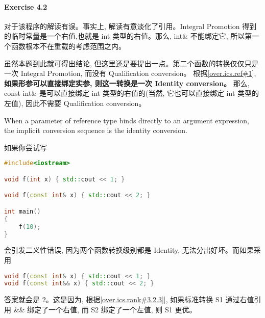 \documentclass{article}
\begin{document}
	\paragraph*{Exercise 4.2} 
	
	对于该程序的解读有误。事实上, 解读有意淡化了引用。Integral Promotion 得到的临时常量是一个右值,也就是 int 类型的右值。那么, int\& 不能绑定它, 所以第一个函数根本不在重载的考虑范围之内。
	
	虽然本题到此就可得出结论, 但这里还是要提出一点。第二个函数的转换仅仅只是一次 Integral Promotion, 而没有 Qualification conversion。 根据\href{https://timsong-cpp.github.io/cppwp/n4659/over.ics.ref#1}{[over.ics.ref\#1]}, \textbf{如果形参可以直接绑定实参, 则这一转换是一次 Identity conversion。} 那么, const int\& 是可以直接绑定 int 类型的右值的(当然, 它也可以直接绑定 int 类型的左值), 因此不需要 Qualification conversion。
	
	\begin{lightgrayleftbar}
		When a parameter of reference type binds directly to an argument expression, the implicit conversion sequence is the identity conversion.
	\end{lightgrayleftbar}

	如果你尝试写 
	
	\begin{lstlisting}[language=C++]
#include<iostream>

void f(int x) { std::cout << 1; }

void f(const int& x) { std::cout << 2; }

int main() 
{
	f(10);
}
	\end{lstlisting}
	
	会引发二义性错误, 因为两个函数转换级别都是 Identity, 无法分出好坏。而如果采用
	
	\begin{lstlisting}[language=C++]
void f(const int& x) { std::cout << 1; }
void f(const int&& x) { std::cout << 2; }
	\end{lstlisting}
	
	答案就会是 2。这是因为, 根据\href{https://timsong-cpp.github.io/cppwp/n4659/over.ics.rank#3.2.3}{[over.ics.rank\#3.2.3]]}, 如果标准转换 S1 通过右值引用 \&\& 绑定了一个右值, 而 S2 绑定了一个左值, 则 S1 更优。 
\end{document}

